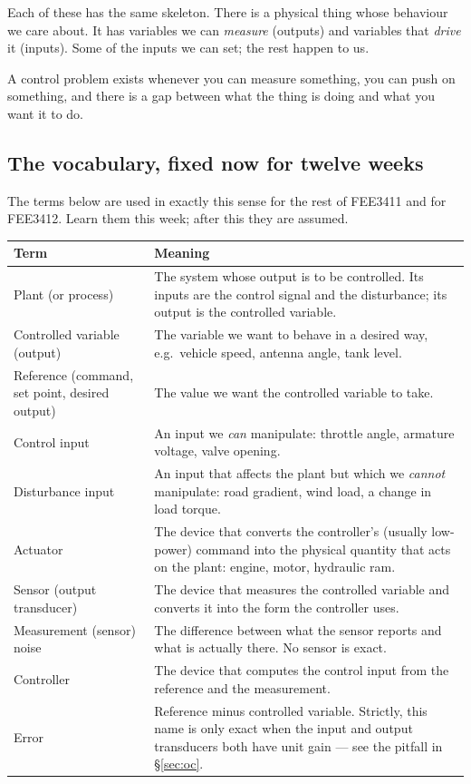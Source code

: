 \documentclass[11pt,a4paper]{article}
\begin{document}
Each of these has the same skeleton. There is a physical thing whose behaviour
we care about. It has variables we can \emph{measure} (outputs) and variables
that \emph{drive} it (inputs). Some of the inputs we can set; the rest happen
to us.

\begin{keyidea}
A control problem exists whenever you can measure something, you can push on
something, and there is a gap between what the thing is doing and what you
want it to do.
\end{keyidea}

\subsection{The vocabulary, fixed now for twelve weeks}

The terms below are used in exactly this sense for the rest of FEE3411 and for
FEE3412. Learn them this week; after this they are assumed.

\begin{center}
\begin{tabular}{@{}p{}p{}@{}}
\toprule
\textbf{Term} & \textbf{Meaning} \\
\midrule
Plant (or process) & The system whose output is to be controlled. Its inputs
are the control signal and the disturbance; its output is the controlled
variable.\\
Controlled variable (output) & The variable we want to behave in a desired way,
e.g.\ vehicle speed, antenna angle, tank level.\\
Reference (command, set point, desired output) & The value we want the
controlled variable to take.\\
Control input & An input we \emph{can} manipulate: throttle angle, armature
voltage, valve opening.\\
Disturbance input & An input that affects the plant but which we \emph{cannot}
manipulate: road gradient, wind load, a change in load torque.\\
Actuator & The device that converts the controller's (usually low-power)
command into the physical quantity that acts on the plant: engine, motor,
hydraulic ram.\\
Sensor (output transducer) & The device that measures the controlled variable
and converts it into the form the controller uses.\\
Measurement (sensor) noise & The difference between what the sensor reports and
what is actually there. No sensor is exact.\\
Controller & The device that computes the control input from the reference and
the measurement.\\
Error & Reference minus controlled variable. Strictly, this name is only exact
when the input and output transducers both have unit gain --- see the pitfall
in \S\ref{sec:oc}.\\
\bottomrule
\end{tabular}
\end{center}
\end{document}
